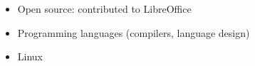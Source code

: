\documentclass[8pt]{developercv} %
\begin{document}
    \begin{itemize}[topsep=0pt,parsep=0pt,partopsep=0pt,leftmargin=26mm]
    \item Open source: contributed to LibreOffice
    \item Programming languages (compilers, language design)
    \item Linux
\end{itemize}

\vspace*{\fill}



\end{document}
